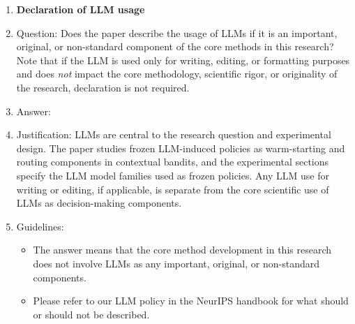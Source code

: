 \documentclass{article}
\theoremstyle{definition}
\theoremstyle{remark}
\theoremstyle{remark}
\begin{document}
\begin{enumerate}
\item {\bf Declaration of LLM usage}
    \item[] Question: Does the paper describe the usage of LLMs if it is an important, original, or non-standard component of the core methods in this research? Note that if the LLM is used only for writing, editing, or formatting purposes and does \emph{not} impact the core methodology, scientific rigor, or originality of the research, declaration is not required.
    \item[] Answer: \answerYes{} %
    \item[] Justification: LLMs are central to the research question and experimental design. The paper studies frozen LLM-induced policies as warm-starting and routing components in contextual bandits, and the experimental sections specify the LLM model families used as frozen policies. Any LLM use for writing or editing, if applicable, is separate from the core scientific use of LLMs as decision-making components.
    \item[] Guidelines:
    \begin{itemize}
        \item The answer \answerNA{} means that the core method development in this research does not involve LLMs as any important, original, or non-standard components.
        \item Please refer to our LLM policy in the NeurIPS handbook for what should or should not be described.
    \end{itemize}

\end{enumerate}
\end{document}
